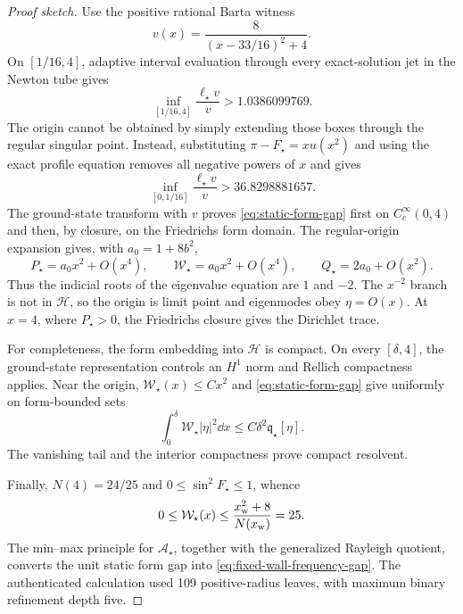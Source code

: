 \begin{proof}[Proof sketch]
Use the positive rational Barta witness
\begin{equation}
 v(x)=\frac{8}{(x-33/16)^2+4}.
\end{equation}
On $[1/16,4]$, adaptive interval evaluation through every exact-solution jet
in the Newton tube gives
\begin{equation}
 \inf_{[1/16,4]}\frac{\ell_\star v}{v}
 >1.0386099769.
 \label{eq:positive-radius-barta}
\end{equation}
The origin cannot be obtained by simply extending those boxes through the
regular singular point.  Instead, substituting
$\pi-F_\star=xu(x^2)$ and using the exact profile equation removes all negative
powers of $x$ and gives
\begin{equation}
 \inf_{[0,1/16]}\frac{\ell_\star v}{v}
 >36.8298881657.
 \label{eq:origin-barta}
\end{equation}
The ground-state transform with $v$ proves
\cref{eq:static-form-gap} first on $C_c^\infty(0,4)$ and then, by closure, on
the Friedrichs form domain.  The regular-origin expansion gives, with
$a_0=1+8b^2$,
\begin{equation}
 P_\star=a_0x^2+O(x^4),\qquad
 \mathcal W_\star=a_0x^2+O(x^4),\qquad
 Q_\star=2a_0+O(x^2).
 \label{eq:radial-origin-coefficients}
\end{equation}
Thus the indicial roots of the eigenvalue equation are $1$ and $-2$.
The $x^{-2}$ branch is not in $\mathscr H$, so the origin is limit point and
eigenmodes obey $\eta=O(x)$.  At $x=4$, where $P_\star>0$, the
Friedrichs closure gives the Dirichlet trace.

For completeness, the form embedding into $\mathscr H$ is compact.  On every
$[\delta,4]$, the ground-state representation controls an $H^1$ norm and
Rellich compactness applies.  Near the origin,
$\mathcal W_\star(x)\leq Cx^2$ and
\cref{eq:static-form-gap} give uniformly on form-bounded sets
\begin{equation}
 \int_0^\delta\mathcal W_\star|\eta|^2\dd x
 \leq C\delta^2\mathfrak q_\star[\eta].
\end{equation}
The vanishing tail and the interior compactness prove compact resolvent.

Finally, $N(4)=24/25$ and $0\leq\sin^2F_\star\leq1$, whence
\begin{equation}
 0\leq\mathcal W_\star(x)
 \leq\frac{x_{\rm w}^2+8}{N(x_{\rm w})}=25.
\end{equation}
The min--max principle for $\mathcal A_\star$, together with the generalized Rayleigh
quotient, converts the unit static form gap into
\cref{eq:fixed-wall-frequency-gap}.  The authenticated calculation used 109
positive-radius leaves, with maximum binary refinement depth five.
\end{proof}

